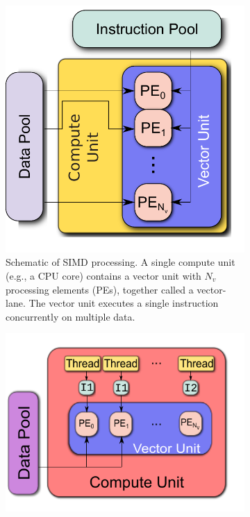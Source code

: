 \documentclass[12pt,number,sort&compress,preprint]{elsarticle}
\begin{document}
\begin{figure}[htb]
  \centering
  \begin{subfigure}[t]{0.45\linewidth}
      \includegraphics[width=\textwidth]{SIMD.pdf}
      \caption{Schematic of SIMD processing.  A single compute unit (e.g., a CPU core) contains a vector unit with $N_v$ processing elements (PEs), together called a vector-lane.  The vector unit executes a single instruction concurrently on multiple data.}
      \label{F:SIMD}
  \end{subfigure}
  \hfill
  \begin{subfigure}[t]{0.45\linewidth}
      \includegraphics[width=\textwidth]{SIMT.pdf}

\end{subfigure}
\end{figure}
\end{document}
